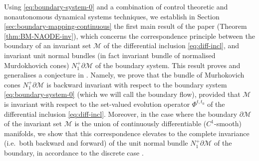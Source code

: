 \documentclass[reqno]{amsart}
\theoremstyle{definition}
\numberwithin{equation}{section}
\newcommand{\M}{\mathscr{M}}
\begin{document}


Using \eqref{eq:boundary-system-0} and a combination of control theoretic and nonautonomous dynamical systems techniques, we establish in Section \ref{sec:boundary-mapping-continuous} the first main result of the paper (Theorem \ref{thm:BM-NAODE-inv}), which concerns the correspondence principle between the boundary of an invariant set $\M$ of the differential inclusion \eqref{eq:diff-incl}, and invariant unit normal bundles (in fact invariant bundle of normalised Murdokhovich cones) $N_1^+\partial \M$ of the boundary system. This result proves and generalises a conjecture in \cite{Tey2022minimal}. Namely, we prove that the bundle of Murhokovich cones $N_1^+\partial \M$ is backward invariant with respect to the boundary system \eqref{eq:boundary-system-0} (which we will call the boundary flow), provided that $\M$ is invariant with respect to the set-valued evolution operator $\Phi^{t,t_0}$ of the differential inclusion \eqref{eq:diff-incl}. Moreover, in the case where the boundary $\partial \M$ of the invariant set $\M$ is the union of continuously differentiable ($C^1$-smooth) manifolds, we show that this correspondence elevates to the complete invariance (i.e.~both backward and forward) of the unit normal bundle $N_1^+\partial \M$ of the boundary, in accordance to the discrete case \cite{kourliouros2023persistence}. 
\end{document}
